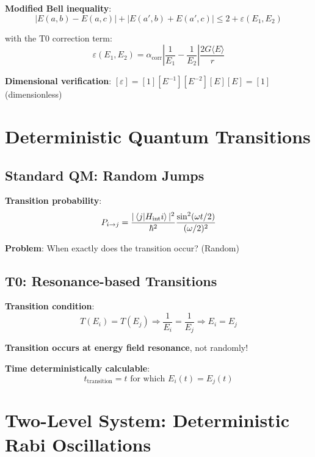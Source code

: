 \documentclass[12pt,a4paper]{article}
\begin{document}
	\textbf{Modified Bell inequality}:
	\begin{equation}
		\boxed{|E(a,b) - E(a,c)| + |E(a',b) + E(a',c)| \leq 2 + \varepsilon(E_1, E_2)}
	\end{equation}
	
	with the T0 correction term:
	\begin{equation}
		\varepsilon(E_1, E_2) = \alpha_{\text{corr}} \left|\frac{1}{E_1} - \frac{1}{E_2}\right| \frac{2G\langle E \rangle}{r}
	\end{equation}
	
	\textbf{Dimensional verification}: $[\varepsilon] = [1][E^{-1}][E^{-2}][E][E] = [1]$ (dimensionless) \checkmark
	
	\section{Deterministic Quantum Transitions}
	
	\subsection{Standard QM: Random Jumps}
	
	\textbf{Transition probability}:
	\begin{equation}
		P_{i \to j} = \frac{|\braket{j}{H_{\text{int}} i}|^2}{\hbar^2} \frac{\sin^2(\omega t/2)}{(\omega/2)^2}
	\end{equation}
	
	\textbf{Problem}: When exactly does the transition occur? (Random)
	
	\subsection{T0: Resonance-based Transitions}
	
	\textbf{Transition condition}:
	\begin{equation}
		\boxed{T(E_i) = T(E_j) \Rightarrow \frac{1}{E_i} = \frac{1}{E_j} \Rightarrow E_i = E_j}
	\end{equation}
	
	\textbf{Transition occurs at energy field resonance}, not randomly!
	
	\textbf{Time deterministically calculable}:
	\begin{equation}
		t_{\text{transition}} = t \text{ for which } E_i(t) = E_j(t)
	\end{equation}
	
	\section{Two-Level System: Deterministic Rabi Oscillations}
	
\end{document}
